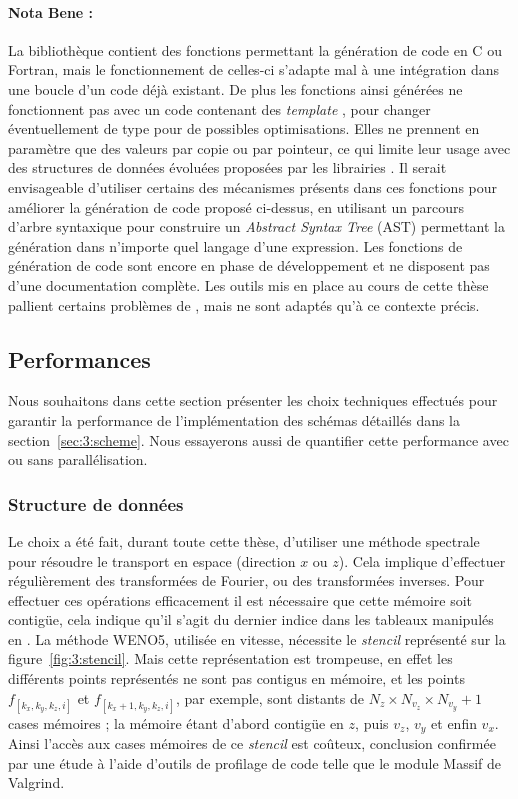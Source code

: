 \paragraph{Nota Bene :} La bibliothèque \sympy{} contient des fonctions permettant la génération de code en C ou Fortran, mais le fonctionnement de celles-ci s'adapte mal à une intégration dans une boucle d'un code déjà existant. De plus les fonctions ainsi générées ne fonctionnent pas avec un code contenant des \emph{template} \CC, pour changer éventuellement de type pour de possibles optimisations. Elles ne prennent en paramètre que des valeurs par copie ou par pointeur, ce qui limite leur usage avec des structures de données évoluées proposées par les librairies \CC. Il serait envisageable d'utiliser certains des mécanismes présents dans ces fonctions pour améliorer la génération de code proposé ci-dessus, en utilisant un parcours d'arbre syntaxique pour construire un \emph{Abstract Syntax Tree} (AST) permettant la génération dans n'importe quel langage d'une expression. Les fonctions \sympy{} de génération de code sont encore en phase de développement et ne disposent pas d'une documentation complète. Les outils mis en place au cours de cette thèse pallient certains problèmes de \sympy{}, mais ne sont adaptés qu'à ce contexte précis.

\subsection{Performances}

Nous souhaitons dans cette section présenter les choix techniques effectués pour garantir la performance de l'implémentation des schémas détaillés dans la section~\ref{sec:3:scheme}. Nous essayerons aussi de quantifier cette performance avec ou sans parallélisation.

\subsubsection{Structure de données}

Le choix a été fait, durant toute cette thèse, d'utiliser une méthode spectrale pour résoudre le transport en espace (direction $x$ ou $z$). Cela implique d'effectuer régulièrement des transformées de Fourier, ou des transformées inverses. Pour effectuer ces opérations efficacement il est nécessaire que cette mémoire soit contigüe, cela indique qu'il s'agit du dernier indice dans les tableaux manipulés en \CC. La méthode WENO5, utilisée en vitesse, nécessite le \emph{stencil} représenté sur la figure~\ref{fig:3:stencil}. Mais cette représentation est trompeuse, en effet les différents points représentés ne sont pas contigus en mémoire, et les points $f_{[k_x,k_y,k_z,i]}$ et $f_{[k_x+1,k_y,k_z,i]}$, par exemple, sont distants de $N_z\times N_{v_z} \times N_{v_y} + 1$ cases mémoires ; la mémoire étant d'abord contigüe en $z$, puis $v_z$, $v_y$ et enfin $v_x$. Ainsi l'accès aux cases mémoires de ce \emph{stencil} est coûteux, conclusion confirmée par une étude à l'aide d'outils de profilage de code telle que le module Massif de Valgrind.

